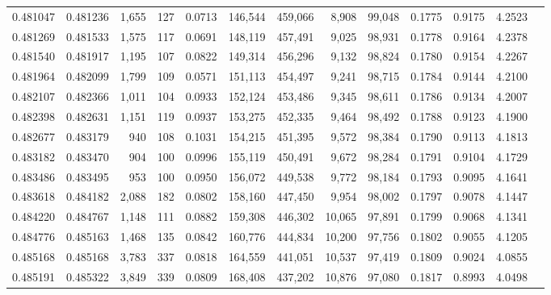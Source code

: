 \begin{tabular}{rrrrrrrrrrrrr}
0.481047 & 0.481236 & 1,655 &   127 &                                     0.0713 & 146,544 & 459,066 &   8,908 &  99,048 & 0.1775 & 0.9175 & 4.2523 \\
0.481269 & 0.481533 & 1,575 &   117 &                                     0.0691 & 148,119 & 457,491 &   9,025 &  98,931 & 0.1778 & 0.9164 & 4.2378 \\
0.481540 & 0.481917 & 1,195 &   107 &                                     0.0822 & 149,314 & 456,296 &   9,132 &  98,824 & 0.1780 & 0.9154 & 4.2267 \\
0.481964 & 0.482099 & 1,799 &   109 &                                     0.0571 & 151,113 & 454,497 &   9,241 &  98,715 & 0.1784 & 0.9144 & 4.2100 \\
0.482107 & 0.482366 & 1,011 &   104 &                                     0.0933 & 152,124 & 453,486 &   9,345 &  98,611 & 0.1786 & 0.9134 & 4.2007 \\
0.482398 & 0.482631 & 1,151 &   119 &                                     0.0937 & 153,275 & 452,335 &   9,464 &  98,492 & 0.1788 & 0.9123 & 4.1900 \\
0.482677 & 0.483179 &   940 &   108 &                                     0.1031 & 154,215 & 451,395 &   9,572 &  98,384 & 0.1790 & 0.9113 & 4.1813 \\
0.483182 & 0.483470 &   904 &   100 &                                     0.0996 & 155,119 & 450,491 &   9,672 &  98,284 & 0.1791 & 0.9104 & 4.1729 \\
0.483486 & 0.483495 &   953 &   100 &                                     0.0950 & 156,072 & 449,538 &   9,772 &  98,184 & 0.1793 & 0.9095 & 4.1641 \\
0.483618 & 0.484182 & 2,088 &   182 &                                     0.0802 & 158,160 & 447,450 &   9,954 &  98,002 & 0.1797 & 0.9078 & 4.1447 \\
0.484220 & 0.484767 & 1,148 &   111 &                                     0.0882 & 159,308 & 446,302 &  10,065 &  97,891 & 0.1799 & 0.9068 & 4.1341 \\
0.484776 & 0.485163 & 1,468 &   135 &                                     0.0842 & 160,776 & 444,834 &  10,200 &  97,756 & 0.1802 & 0.9055 & 4.1205 \\
0.485168 & 0.485168 & 3,783 &   337 &                                     0.0818 & 164,559 & 441,051 &  10,537 &  97,419 & 0.1809 & 0.9024 & 4.0855 \\
0.485191 & 0.485322 & 3,849 &   339 &                                     0.0809 & 168,408 & 437,202 &  10,876 &  97,080 & 0.1817 & 0.8993 & 4.0498 \\

\end{tabular}
